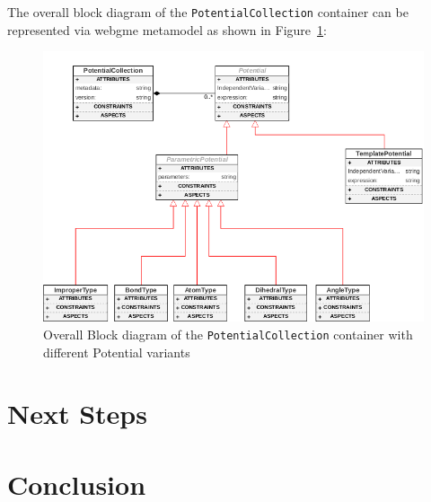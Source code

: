 \documentclass[12pt]{article}
\begin{document}
The overall block diagram of the \texttt{PotentialCollection} container can be represented via webgme metamodel as shown in Figure~\ref{fig:FFDiagram}:

\begin{figure}[ht]
    \centering
    \includegraphics[width=\textwidth]{docs/pot}
    \caption{Overall Block diagram of the \texttt{PotentialCollection} container with different Potential variants}
    \label{fig:FFDiagram}
\end{figure}

\section{Next Steps}
\section{Conclusion}
\end{document}

